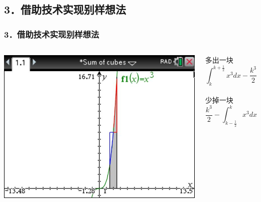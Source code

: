 \documentclass[aspectratio=169]{beamer}
\begin{document}
\subsection{3．借助技术实现别样想法}
        \begin{frame}
      \frametitle{3．借助技术实现别样想法}
      \begin{columns}
      	\includegraphics[scale=0.3]{定积分图示.jpg}
      	
        \color{red} 多出一块\[   \int_{k}^{k+\frac{1}{2} } x^3 dx - \frac{k^3}{2}   \]   \\
        \color{blue!50!white} 少掉一块 \[ \frac{k^3}{2} - \int_{k-\frac{1}{2}}^{k } x^3 dx \]   \\
        \hspace{2cm}
      \end{columns}      
  \end{frame}
\end{document}
